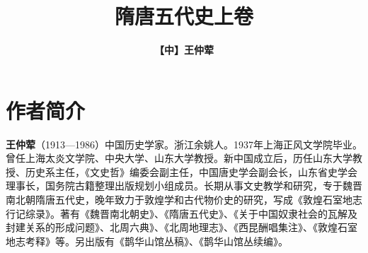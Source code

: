 \documentclass[fontset=fandol, a4paper, 12pt, openright]{ctexbook}
\title{\Huge \textbf{隋唐五代史\quad 上卷}\\}
\author{\textbf{【中】王仲荤}}
\date{}
\begin{document}
\frontmatter

\maketitle

\chapter*{作者简介}

\textbf{王仲荤}（1913—1986）中国历史学家。浙江余姚人。1937年上海正风文学院毕业。曾任上海太炎文学院、中央大学、山东大学教授。新中国成立后，历任山东大学教授、历史系主任，《文史哲》编委会副主任，中国唐史学会副会长，山东省史学会理事长，国务院古籍整理出版规划小组成员。长期从事文史教学和研究，专于魏晋南北朝隋唐五代史，晚年致力于敦煌学和古代物价史的研究，写成《敦煌石室地志行记综录》。著有《魏晋南北朝史》、《隋唐五代史》、《关于中国奴隶社会的瓦解及封建关系的形成问题》、北周六典》、《北周地理志》、《西昆酬唱集注》、《敦煌石室地志考释》等。另出版有《鹊华山馆丛稿》、《鹊华山馆丛续编》。

\tableofcontents

\mainmatter

\end{document}
